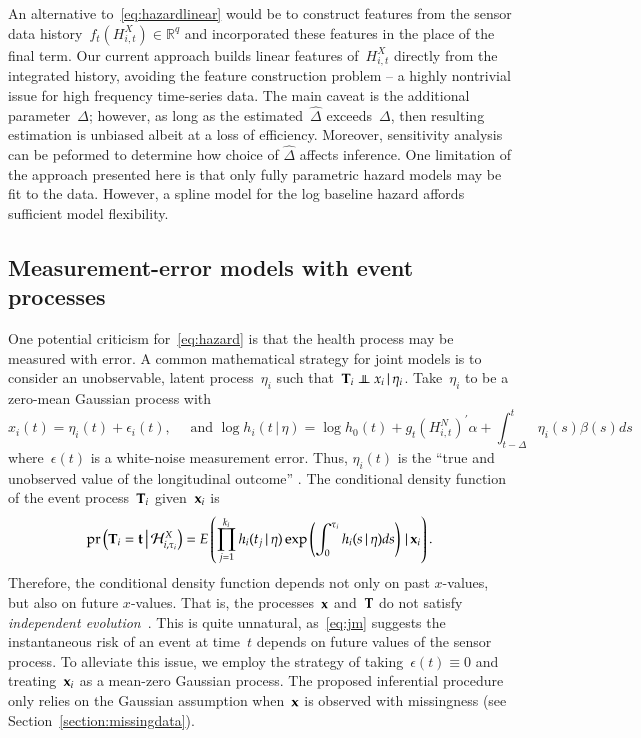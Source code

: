 \documentclass[12pt]{amsart}
\def\pr{\mathop{\text{pr}}\nolimits}
\def\pr{\mathop{\text{pr}}\nolimits}
\def\indep{\mathrel{\rlap{$\perp$}\kern1.6pt\mathord{\perp}}}
\def\H{\mathcal{H}}
\def\given{\, | \,}
\def\Given{\, \big | \,}
\def\bft{{\bf t}}
\def\bfx{{\bf x}}
\def\bfT{{\bf T}}
\begin{document}
An alternative to~\eqref{eq:hazardlinear} would be to construct
features from the sensor data history~$f_t ( H_{i,t}^{X}) \in
\mathbb{R}^q$ and incorporated these features in the place of the
final term. Our current approach builds linear features of~$H_{i,t}^X$
directly from the integrated history, avoiding the feature
construction problem -- a highly nontrivial issue for high frequency
time-series data.  The main caveat is the additional
parameter~$\Delta$; however, as long as the estimated~$\hat \Delta$
exceeds~$\Delta$, then resulting estimation is unbiased albeit at a
loss of efficiency.  Moreover, sensitivity analysis can be peformed to
determine how choice of $\hat \Delta$ affects inference.  One
limitation of the approach presented here is that only fully
parametric hazard models may be fit to the data. However, a spline
model for the log baseline hazard affords sufficient model
flexibility. 

\subsection{Measurement-error models with event processes}
\label{section:memproblems}

One potential criticism for~\eqref{eq:hazard} is that the health
process may be measured with error.  
A common mathematical strategy for joint models is to consider an
unobservable, latent process~$\eta_i$ such that~$\bfT_i \indep x_i
\given \eta_i$. Take~$\eta_i$ to be a zero-mean Gaussian process with 
\begin{equation}\label{eq:jm}
x_i(t) = \eta_i (t) + \epsilon_i (t),\quad \text{ and } \log h_i (t
\given \eta ) = \log h_0 (t) + g_t \left( H_{i,t}^N \right)^{\prime}
\alpha + \int_{t-\Delta}^t \eta_i (s) \beta (s) ds
\end{equation}
where~$\epsilon (t)$ is a white-noise measurement error. Thus,
$\eta_i (t)$ is the ``true and unobserved value of the longitudinal
outcome'' \citep[Sec. 2.1, pp.3]{Rizopoulos2010}. The conditional
density function of the event process~$\bfT_i$ given~$\bfx_i$ is 
\[
\pr \left ( \bfT_i = \bft \Given \H_{i,\tau_i}^X \right) = E \left(
  \prod_{j=1}^{k_i} h_i (t_j \given \eta) \exp \left(
    \int_{0}^{\tau_i} h_i (s \given \eta ) ds \right) \given \bfx_i \right).
\]
Therefore, the conditional density function depends not only on past
$x$-values, but also on future $x$-values.
That is, the processes~$\bfx$ and~$\bfT$ do not satisfy
\emph{independent evolution}~\citep{DempseyPMCC2}. 
This is quite unnatural, as~\eqref{eq:jm} suggests the instantaneous
risk of an event at time~$t$ depends on future values of the sensor
process. To alleviate this issue, we employ the strategy of
taking~$\epsilon (t) \equiv 0$ and treating~$\bfx_i$ as a mean-zero
Gaussian process. The proposed inferential procedure only relies on
the Gaussian assumption when~$\bfx$ is observed with missingness (see 
Section~\ref{section:missingdata}).
\end{document}
